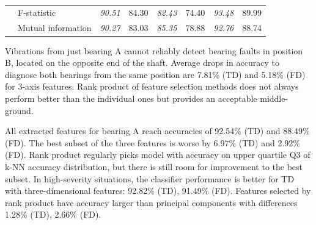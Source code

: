 \documentclass{llncs}
\begin{document}
\begin{table}
\begin{tabular}{|r|l|p{1.2cm}|p{1.2cm}|p{1.2cm}|p{1.2cm}|p{1.2cm}|p{1.2cm}|}
                                                     & F-statistic                                           & \textit{90.51}                      & 84.30                              & \textit{82.43}                      & 74.40                              & \textit{93.48}                      & 89.99                              \\
                                                     & Mutual information                                    & \textit{90.27}                      & 83.03                              & \textit{85.35}                      & 78.88                              & \textit{92.76}                      & 88.74                     \\         
                                      \hline                    
\end{tabular}
\end{table} 

Vibrations from just bearing A cannot reliably detect bearing faults in position B, located on the opposite end of the shaft. Average drops in accuracy to diagnose both bearings from the same position are 7.81\% (TD) and 5.18\% (FD) for 3-axis features. Rank product of feature selection methods does not always perform better than the individual ones but provides an acceptable middle-ground. 

All extracted features for bearing A reach accuracies of 92.54\% (TD) and 88.49\% (FD). The best subset of the three features is worse by 6.97\% (TD) and 2.92\% (FD). Rank product regularly picks model with accuracy on upper quartile Q3 of k-NN accuracy distribution, but there is still room for improvement to the best subset. In high-severity situations, the classifier performance is better for TD with three-dimensional features: 92.82\% (TD), 91.49\% (FD). Features selected by rank product have accuracy larger than principal components with differences 1.28\% (TD), 2.66\% (FD).
\end{document}
